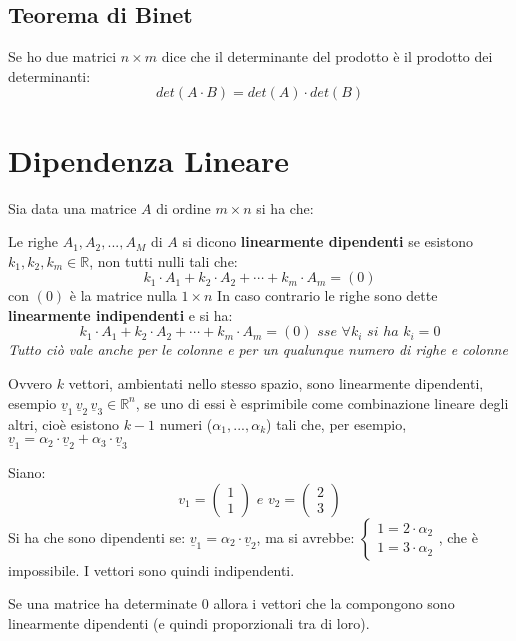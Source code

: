 \documentclass[a4paper,12pt, oneside]{book}
\begin{document}
\subsection{Teorema di Binet}
\begin{teorema}[di Binet]
Se ho due matrici $n\times m$ dice che il determinante del prodotto è il prodotto dei determinanti:
$$det(A\cdot B)=det(A)\cdot det(B)$$
\end{teorema}
\section{Dipendenza Lineare}
Sia data una matrice $A$ di ordine $m\times n$ si ha che:
\begin{definizione}
Le righe $A_1,A_2,...,A_M$ di $A$ si dicono \textbf{linearmente dipendenti} se esistono $k_1,k_2,k_m \in \mathbb{R}$, non tutti nulli tali che:
$$k_1\cdot A_1+k_2\cdot A_2+\cdots+k_m\cdot A_m=(0)$$
con $(0)$ è la matrice nulla $1\times n$
In caso contrario le righe sono dette \textbf{linearmente indipendenti} e si ha:
$$k_1\cdot A_1+k_2\cdot A_2+\cdots+k_m\cdot A_m=(0)\,\, sse\,\, \forall k_i \,\, si \,\, ha \,\, k_i=0$$
\textit{Tutto ciò vale anche per le colonne e per un qualunque numero di righe e colonne}
\end{definizione} 
Ovvero $k$ vettori, ambientati nello stesso spazio, sono linearmente dipendenti, esempio $\underline{v}_1\, \underline{v}_2\, \underline{v}_3\in \mathbb{R}^{n}$, se uno di essi è esprimibile come combinazione lineare degli altri, cioè esistono $k-1$ numeri ($\alpha_1,...,\alpha_k$) tali che, per esempio, $\underline{v}_1=\alpha_2\cdot \underline{v}_2+\alpha_3\cdot \underline{v}_3$
\begin{esempio}
Siano:
$$
v_1=\left(
\begin{matrix}
1\\
1
\end{matrix}
\right)\,\, e \,\, 
v_2=\left(
\begin{matrix}
2\\
3
\end{matrix}
\right)
$$
Si ha che sono dipendenti se:
$\underline{v}_1=\alpha_2\cdot \underline{v}_2$, ma si avrebbe:
$\begin{cases}1=2\cdot\alpha_2\\1=3\cdot\alpha_2\end{cases}$, che è impossibile. I vettori sono quindi indipendenti.
\end{esempio}
Se una matrice ha determinate 0 allora i vettori che la compongono sono linearmente dipendenti (e quindi proporzionali tra di loro).
\end{document}
